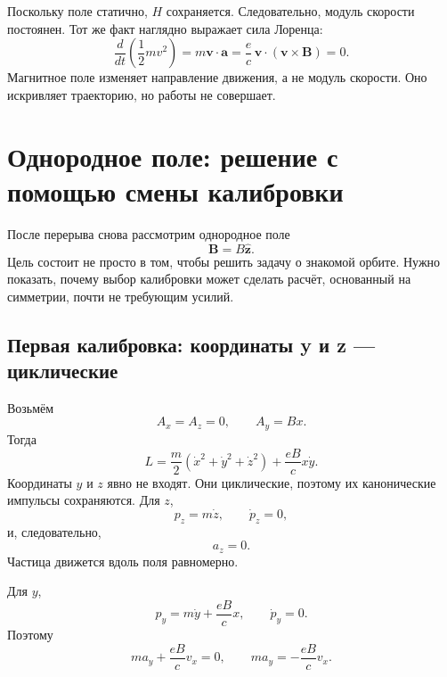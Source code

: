 Поскольку поле статично, \(H\) сохраняется. Следовательно, модуль скорости постоянен. Тот же факт наглядно выражает сила Лоренца:
\begin{equation}
  \frac{d}{dt}\left(\frac12mv^2\right)
  =
  m\mathbf v\cdot\mathbf a
  =
  \frac{e}{c}\,
  \mathbf v\cdot(\mathbf v\times\mathbf B)
  =0.
\end{equation}
Магнитное поле изменяет направление движения, а не модуль скорости. Оно искривляет траекторию, но работы не совершает.

\section{Однородное поле: решение с помощью смены калибровки}

После перерыва снова рассмотрим однородное поле
\begin{equation}
  \mathbf B=B\hat{\mathbf z}.
\end{equation}
Цель состоит не просто в том, чтобы решить задачу о знакомой орбите. Нужно показать, почему выбор калибровки может сделать расчёт, основанный на симметрии, почти не требующим усилий.

\subsection{Первая калибровка: координаты y и z — циклические}

Возьмём
\begin{equation}
  A_x=A_z=0,
  \qquad
  A_y=Bx.
\end{equation}
Тогда
\begin{equation}
  L
  =
  \frac{m}{2}
  \left(\dot x^2+\dot y^2+\dot z^2\right)
  +
  \frac{eB}{c}x\dot y.
\end{equation}
Координаты \(y\) и \(z\) явно не входят. Они циклические, поэтому их канонические импульсы сохраняются. Для \(z\),
\begin{equation}
  p_z=m\dot z,
  \qquad
  \dot p_z=0,
\end{equation}
и, следовательно,
\begin{equation}
  a_z=0.
\end{equation}
Частица движется вдоль поля равномерно.

Для \(y\),
\begin{equation}
  p_y=m\dot y+\frac{eB}{c}x,
  \qquad
  \dot p_y=0.
\end{equation}
Поэтому
\begin{equation}
  m a_y+\frac{eB}{c}v_x=0,
  \qquad
  \boxed{m a_y=-\frac{eB}{c}v_x}.
\end{equation}

